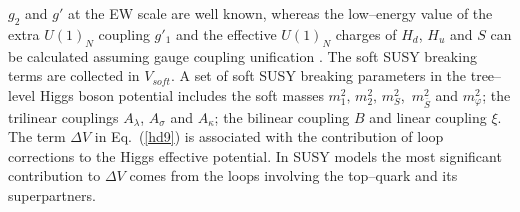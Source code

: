\documentclass[12pt,a4paper]{article}
\begin{document}
$g_2$ and $g'$ at the EW scale are well known, whereas the low--energy value of the extra $U(1)_{N}$ coupling $g'_1$ and the effective
$U(1)_{N}$ charges of $H_d$, $H_u$ and $S$ can be calculated assuming gauge coupling unification \cite{King:2005jy}.
The soft SUSY breaking terms are collected in $V_{soft}$. A set of soft SUSY breaking parameters in the tree--level Higgs boson
potential includes the soft masses $m_1^2,\,m_2^2,\,m_{S}^2$,\, $m_{\overline{S}}^2$ and $m^2_{\varphi}$; the trilinear
couplings $A_{\lambda}$, $A_{\sigma}$ and $A_{\kappa}$; the bilinear coupling $B$ and linear coupling $\xi$.
The term $\Delta V$ in Eq.~(\ref{hd9}) is associated with the contribution of loop corrections to the Higgs effective potential.
In SUSY models the most significant contribution to $\Delta V$ comes from the loops involving the top--quark and its superpartners.
\end{document}
